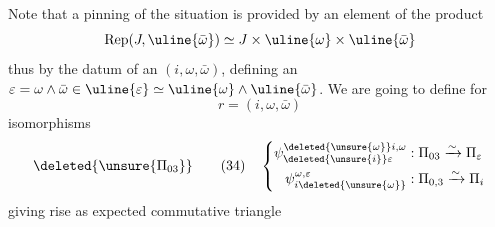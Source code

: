 Note that a pinning of the situation is provided by an element of the product
\[
\operatorname{Rep}(J,\uline{\bar\omega})\simeq J\times\uline{\omega}\times\uline{\bar\omega}
\]
thus by the datum of an $(i,\omega,\bar\omega)$, defining  an $\varepsilon=\omega\wedge\bar\omega\in\uline{\varepsilon}\simeq\uline{\omega}\wedge\uline{\bar\omega}$. We are going to define for
\[
r=(i,\omega,\bar\omega)
\]
isomorphisms
\[
\deleted{\unsure{\Pi_{03}}}\qquad(34)\quad\left\{\begin{aligned}
\psi_{\deleted{\unsure{i}}\varepsilon}^{\deleted{\unsure{\omega}}i,\omega}&:\Pi_{03}\xrightarrow{\sim}\Pi_\varepsilon\\
\psi_{i\deleted{\unsure{\omega}}}^{\omega,\varepsilon}&:\Pi_{0,3}\xrightarrow{\sim}\Pi_i
\end{aligned}\right.
\]
giving rise as expected  commutative triangle
